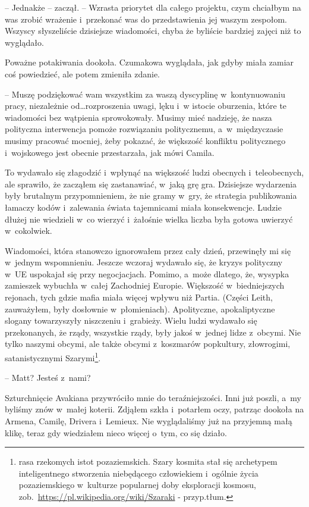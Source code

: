 \documentclass[oneside,polish,12pt,sfheadings]{mwbk}
\begin{document}
-- Jednakże -- zaczął. -- Wzrasta priorytet dla całego projektu, czym
chciałbym na was zrobić wrażenie i~przekonać was do przedstawienia jej
waszym zespołom. Wszyscy słyszeliście dzisiejsze wiadomości, chyba że
byliście bardziej zajęci niż to wyglądało.

Poważne potakiwania dookoła. Czumakowa wyglądała, jak gdyby miała zamiar
coś powiedzieć, ale potem zmieniła zdanie.

-- Muszę podziękować wam wszystkim za waszą dyscyplinę w~kontynuowaniu
pracy, niezależnie od\ldots rozproszenia uwagi, lęku i~w istocie oburzenia,
które te wiadomości bez wątpienia sprowokowały. Musimy mieć nadzieję, że
nasza polityczna interwencja pomoże rozwiązaniu politycznemu, a~w~międzyczasie musimy pracować mocniej, żeby pokazać, że większość
konfliktu politycznego i~wojskowego jest obecnie przestarzała, jak mówi
Camila.

To wydawało się złagodzić i~wpłynąć na większość ludzi obecnych i~teleobecnych, ale sprawiło, że zacząłem się zastanawiać, w~jaką grę gra.
Dzisiejsze wydarzenia były brutalnym przypomnieniem, że nie gramy w~gry,
że strategia publikowania łamaczy kodów i~zalewania świata tajemnicami
miała konsekwencje. Ludzie dłużej nie wiedzieli w~co wierzyć i~żałośnie
wielka liczba była gotowa uwierzyć w~cokolwiek.

Wiadomości, która stanowczo ignorowałem przez cały dzień, przewinęły mi
się w~jednym wspomnieniu. Jeszcze wczoraj wydawało się, że kryzys
polityczny w~UE uspokajał się przy negocjacjach. Pomimo, a~może dlatego,
że, wysypka zamieszek wybuchła w~całej Zachodniej Europie. Większość w~biedniejszych rejonach, tych gdzie mafia miała więcej wpływu niż Partia.
(Części Leith, zauważyłem, były dosłownie w~płomieniach). Apolityczne,
apokaliptyczne slogany towarzyszyły niszczeniu i~grabieży. Wielu ludzi
wydawało się przekonanych, że rządy, wszystkie rządy, były jakoś w~jednej lidze z~obcymi. Nie tylko naszymi obcymi, ale także obcymi z~koszmarów popkultury, złowrogimi, satanistycznymi
Szarymi\footnote{rasa rzekomych istot pozaziemskich.
Szary kosmita stał się archetypem inteligentnego stworzenia niebędącego
człowiekiem i~ogólnie życia pozaziemskiego w~kulturze popularnej doby
eksploracji kosmosu, zob.~\url{https://pl.wikipedia.org/wiki/Szaraki} - przyp.tłum.}.

-- Matt? Jesteś z~nami?

Szturchnięcie Avakiana przywróciło mnie do teraźniejszości. Inni już
poszli, a~my byliśmy znów w~małej koterii. Zdjąłem szkła i~potarłem
oczy, patrząc dookoła na Armena, Camilę, Drivera i~Lemieux. Nie
wyglądaliśmy już na przyjemną małą klikę, teraz gdy wiedziałem nieco
więcej o~tym, co się działo.
\end{document}
